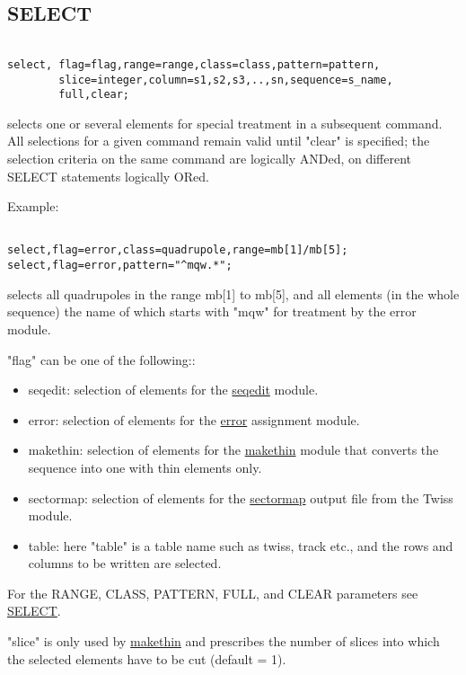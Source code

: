 \subsection{SELECT} %
\begin{verbatim}

select, flag=flag,range=range,class=class,pattern=pattern,
        slice=integer,column=s1,s2,s3,..,sn,sequence=s_name,
        full,clear;
\end{verbatim} 
selects one or several elements for special treatment in a subsequent
command. All selections for a given command remain valid until "clear"
is specified; the selection criteria on the same command are logically
ANDed, on different SELECT statements logically ORed.  

 Example: 
\begin{verbatim}

select,flag=error,class=quadrupole,range=mb[1]/mb[5];
select,flag=error,pattern="^mqw.*";
\end{verbatim} 
selects all quadrupoles in the range mb[1] to mb[5], and all elements
(in the whole sequence) the name of which starts with "mqw" for
treatment by the error module.  

"flag" can be one of the following:: 
\begin{itemize}
	\item seqedit: selection of elements for the
          \href{seqedit.html}{seqedit} module.  
	\item error: selection of elements for the
          \href{../error/error.html}{error} assignment module.  
	\item makethin: selection of elements for the
          \href{../makethin/makethin.html}{makethin} module that
          converts the sequence into one with thin elements only.  
	\item sectormap: selection of elements for the
          \href{../Introduction/sectormap.html}{sectormap} output file
          from the Twiss module.  
	\item table: here "table" is a table name such as twiss, track
          etc., and the rows and columns to be written are selected.  
\end{itemize} For the RANGE, CLASS, PATTERN, FULL, and CLEAR parameters
see \href{../Introduction/select.html}{SELECT}.  

"slice" is only used by \href{../makethin/makethin.html}{makethin} and
prescribes the number of slices into which the selected elements have to
be cut (default = 1).  

